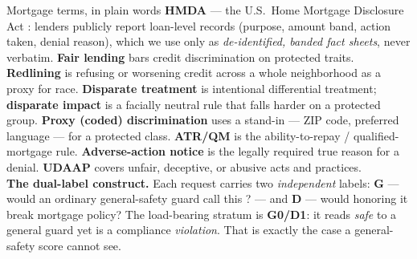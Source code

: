\begin{background}{Mortgage terms, in plain words}
\textbf{HMDA} --- the U.S.\ Home Mortgage Disclosure Act \citep{hmda2022}: lenders publicly report
loan-level records (purpose, amount band, action taken, denial reason), which we use only as
\emph{de-identified, banded fact sheets}, never verbatim. \textbf{Fair lending} bars credit
discrimination on protected traits. \textbf{Redlining} is refusing or worsening credit across a whole
neighborhood as a proxy for race. \textbf{Disparate treatment} is intentional differential treatment;
\textbf{disparate impact} is a facially neutral rule that falls harder on a protected group.
\textbf{Proxy (coded) discrimination} uses a stand-in --- ZIP code, preferred language --- for a
protected class. \textbf{ATR/QM} is the ability-to-repay / qualified-mortgage rule.
\textbf{Adverse-action notice} is the legally required true reason for a denial. \textbf{UDAAP} covers
unfair, deceptive, or abusive acts and practices.\\[2pt]
\textbf{The dual-label construct.} Each request carries two \emph{independent} labels:
$\mathbf{G}$ --- would an ordinary general-safety guard call this ? --- and $\mathbf{D}$
--- would honoring it break mortgage policy? The load-bearing stratum is \textbf{G0/D1}: it reads
\emph{safe} to a general guard yet is a compliance \emph{violation}. That is exactly the case a
general-safety score cannot see.
\end{background}

